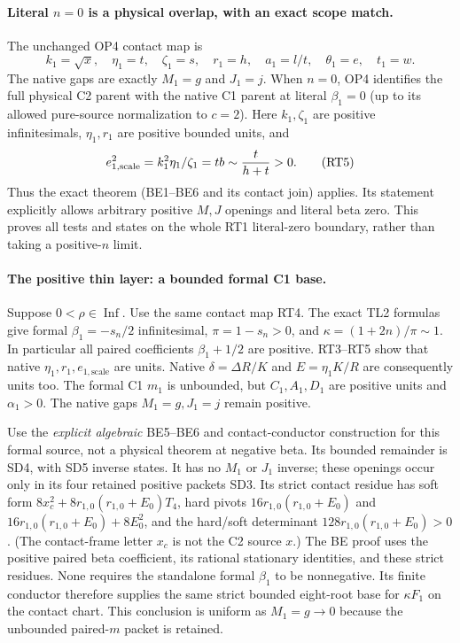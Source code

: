 \paragraph{Literal $n=0$ is a physical overlap, with an exact scope match.}
The unchanged OP4 contact map is
\[
 k_1=\sqrt{x},\quad\eta_1=t,\quad\zeta_1=s,\quad
 r_1=h,\quad a_1=l/t,\quad\theta_1=e,\quad t_1=w.
 \tag{RT4}
\]
The native gaps are exactly $M_1=g$ and $J_1=j$.
When $n=0$, OP4 identifies the full physical C2 parent with the native
C1 parent at literal $\beta_1=0$ (up to its allowed pure-source
normalization to $c=2$). Here $k_1,\zeta_1$ are positive infinitesimals,
$\eta_1,r_1$ are positive bounded units, and
\[
 e_{1,\mathrm{scale}}^2=k_1^2\eta_1/\zeta_1=tb
              \sim {t\over h+t}>0.                 \tag{RT5}
\]
Thus the exact theorem 
(BE1--BE6 and its contact join) applies. Its statement explicitly
allows arbitrary positive $M,J$ openings and literal beta zero.
This proves all tests and states on the whole RT1 literal-zero
boundary, rather than taking a positive-$n$ limit.

\paragraph{The positive thin layer: a bounded formal C1 base.}
Suppose $0<\rho\in\operatorname{Inf}$. Use the same contact map RT4.
The exact TL2 formulas give formal $\beta_1=-s_n/2$ infinitesimal,
$\pi=1-s_n>0$, and $\kappa=(1+2n)/\pi\sim1$. In particular all
paired coefficients $\beta_1+1/2$ are positive. RT3--RT5 show that
native $\eta_1,r_1,e_{1,\mathrm{scale}}$ are units. Native
$\delta=\Delta R/K$ and $E=\eta_1K/R$ are consequently units too.
The formal C1 $m_1$ is unbounded, but $C_1,A_1,D_1$ are positive units
and $\alpha_1>0$. The native gaps $M_1=g,J_1=j$ remain positive.

Use the \emph{explicit algebraic} BE5--BE6 and contact-conductor
construction for this formal source, not a physical theorem at
negative beta. Its bounded remainder is SD4, with SD5 inverse states.
It has no $M_1$ or $J_1$ inverse; these openings occur only in its
four retained positive packets SD3. Its strict contact residue has
soft form $8x_c^2+8r_{1,0}(r_{1,0}+E_0)T_4$, hard pivots
$16r_{1,0}(r_{1,0}+E_0)$ and
$16r_{1,0}(r_{1,0}+E_0)+8E_0^2$, and the hard/soft determinant
$128r_{1,0}(r_{1,0}+E_0)>0$.
(The contact-frame letter $x_c$ is not the C2 source $x$.)
The BE proof uses the positive paired beta coefficient, its rational
stationary identities, and these strict residues. None requires the
standalone formal $\beta_1$ to be nonnegative. Its finite conductor
therefore supplies the same strict bounded eight-root base for
$\kappa F_1$ on the contact chart. This conclusion is uniform as
$M_1=g\to0$ because the unbounded paired-$m$ packet is retained.

